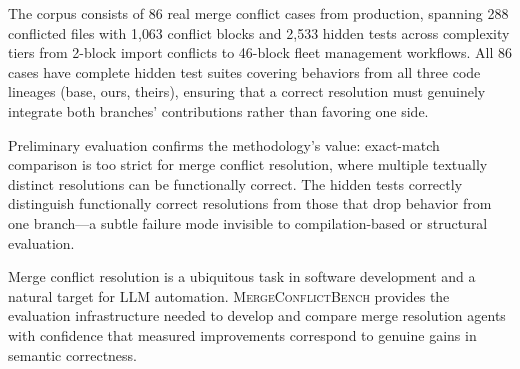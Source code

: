 \documentclass[11pt,a4paper]{article}
\begin{document}
The corpus consists of 86 real merge conflict cases from production, spanning 288 conflicted files with 1{,}063 conflict blocks and 2{,}533 hidden tests across complexity tiers from 2-block import conflicts to 46-block fleet management workflows. All 86 cases have complete hidden test suites covering behaviors from all three code lineages (base, ours, theirs), ensuring that a correct resolution must genuinely integrate both branches' contributions rather than favoring one side.

Preliminary evaluation confirms the methodology's value: exact-match comparison is too strict for merge conflict resolution, where multiple textually distinct resolutions can be functionally correct. The hidden tests correctly distinguish functionally correct resolutions from those that drop behavior from one branch---a subtle failure mode invisible to compilation-based or structural evaluation.

Merge conflict resolution is a ubiquitous task in software development and a natural target for LLM automation. \textsc{MergeConflictBench} provides the evaluation infrastructure needed to develop and compare merge resolution agents with confidence that measured improvements correspond to genuine gains in semantic correctness.



\end{document}
